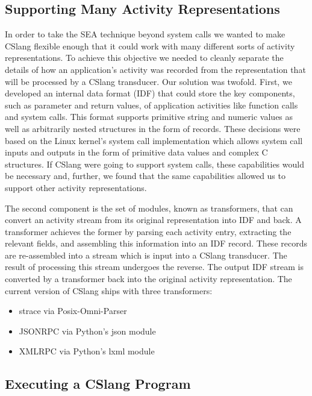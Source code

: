 \subsection{Supporting Many Activity Representations}

In order to take the SEA technique beyond system calls we wanted to make
CSlang flexible enough that it could work with many different sorts of
activity representations.
To achieve this objective we needed to cleanly separate the details of how
an application's activity was recorded from the representation that will be
processed by a CSlang transducer.
Our solution was twofold.  First, we developed an internal data format
(IDF) that
could store the key components, such as parameter and return values,
of application activities like function
calls and system calls.  This format supports primitive string and numeric
values as well as arbitrarily nested structures in the form of records.
These decisions were based on the Linux kernel's system call implementation
which allows system call inputs and outputs in the form of primitive data
values and complex C structures.
If CSlang were going to support system calls, these capabilities would be
necessary and, further, we found that the same capabilities allowed us to
support other activity representations.

The second component is the set of modules, known as transformers, that can
convert an activity stream from its original representation into IDF and
back.  A transformer achieves the former by parsing each activity entry,
extracting the relevant fields, and assembling this information into an IDF
record.  These records are re-assembled into a stream which is input into a
CSlang transducer.  The result of processing this stream undergoes the
reverse.  The output IDF stream is converted by a transformer back into the
original activity representation.  The current version of CSlang ships with
three transformers:
\begin{itemize}
\item{strace via Posix-Omni-Parser}
\item{JSONRPC via Python's json module}
\item{XMLRPC via Python's lxml module}
\end{itemize}


\subsection{Executing a CSlang Program}


